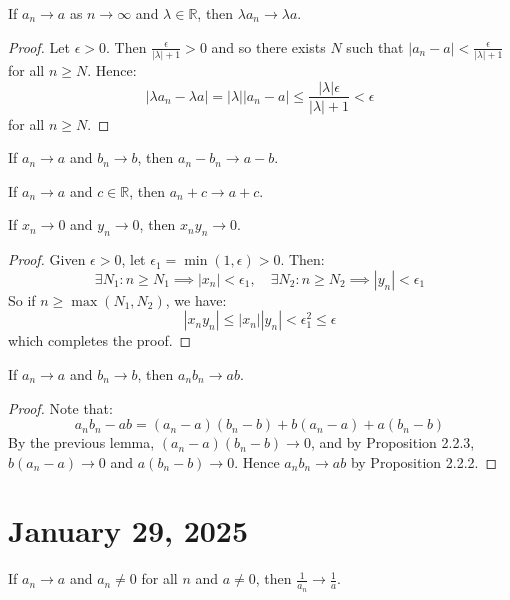 \documentclass[11pt]{article}
\begin{document}
\begin{proposition}
	If $a_n \to a$ as $n \to \infty$ and $\lambda \in \mathbb{R}$, then $\lambda a_n \to \lambda a$.
\end{proposition}

\begin{proof}
	Let $\epsilon > 0$. Then $\frac{\epsilon}{|\lambda| + 1} > 0$ and so there exists $N$ such that $|a_n - a| < \frac{\epsilon}{|\lambda| + 1}$ for all $n \geq N$. Hence:
	\[
		|\lambda a_n - \lambda a| = |\lambda| |a_n - a| \leq \frac{|\lambda| \epsilon}{|\lambda| + 1} < \epsilon
	\]
	for all $n \geq N$.
\end{proof}

\begin{corollary}
	If $a_n \to a$ and $b_n \to b$, then $a_n - b_n \to a - b$.
\end{corollary}

\begin{corollary}
	If $a_n \to a$ and $c \in \mathbb{R}$, then $a_n + c \to a + c$.
\end{corollary}

\begin{lemma}
	If $x_n \to 0$ and $y_n \to 0$, then $x_n y_n \to 0$.
\end{lemma}

\begin{proof}
	Given $\epsilon > 0$, let $\epsilon_1 = \min(1, \epsilon) > 0$. Then:
	\[
		\exists N_1 : n \geq N_1 \implies |x_n| < \epsilon_1, \quad \exists N_2 : n \geq N_2 \implies |y_n| < \epsilon_1
	\]
	So if $n \geq \max(N_1, N_2)$, we have:
	\[
		|x_n y_n| \leq |x_n| |y_n| < \epsilon_1^2 \leq \epsilon
	\]
	which completes the proof.
\end{proof}

\begin{proposition}
	If $a_n \to a$ and $b_n \to b$, then $a_n b_n \to ab$.
\end{proposition}

\begin{proof}
	Note that:
	\[
		a_n b_n - ab = (a_n - a)(b_n - b) + b(a_n - a) + a(b_n - b)
	\]
	By the previous lemma, $(a_n - a)(b_n - b) \to 0$, and by Proposition 2.2.3,
	$b(a_n - a) \to 0$ and $a(b_n - b) \to 0$. Hence $a_n b_n \to ab$ by
	Proposition 2.2.2.
\end{proof}
\section{January 29, 2025}
\begin{proposition}
	If $a_n \to a$ and $a_n \neq 0$ for all $n$ and $a \neq 0$, then $\frac{1}{a_n} \to \frac{1}{a}$.
\end{proposition}
\end{document}
